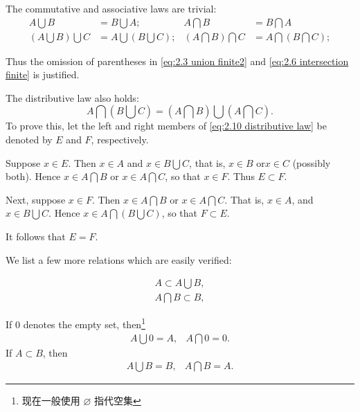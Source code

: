 The commutative and associative laws are trivial:
\begin{align}
        A \bigcup B &= B \bigcup A; &
        A \bigcap B &= B \bigcap A \label{eq:2.8 commutative} \\
        \left(A \bigcup B\right) \bigcup C &= A \bigcup \left(B \bigcup C\right); &
        \left(A \bigcap B\right) \bigcap C &= A \bigcap \left(B \bigcap C\right);\label{eq:2.9 distributive}
\end{align}

Thus the omission of parentheses in \ref{eq:2.3 union finite2} and \ref{eq:2.6 intersection finite} is justified.

The distributive law also holds:
\begin{equation}\label{eq:2.10 distributive law}
    A \bigcap \left( B \bigcup C\right) = 
    \left(A \bigcap B\right) \bigcup \left(A \bigcap C\right).
\end{equation}
To prove this, let the left and right members of \ref{eq:2.10 distributive law} be denoted by $E$ and $F$, respectively.

Suppose $x \in E$. Then $x \in A$ and $x \in B \bigcup C$, that is, $x \in B$ or$ x \in C$ (possibly both). Hence $x \in A\bigcap B$ or $x \in A\bigcap C$, so that $x \in F$. Thus $E \subset F$.

Next, suppose $x \in F$. Then $x \in A\bigcap B$ or $x \in A\bigcap C$. That is, $x \in A$, and $x \in B\bigcup C$. Hence $x \in A\bigcap \left(B \bigcup C\right)$, so that $F \subset E$.

It follows that $E = F$.

We list a few more relations which are easily verified:

\begin{align}
    A \subset A \bigcup B, \label{eq:2.11}\\
    A \bigcap B \subset B, \label{eq:2.12}
\end{align}

If $0$ denotes the empty set, then\footnote{现在一般使用 $\varnothing$ 指代空集}
\begin{equation}
    \begin{array}{cc}
        A \bigcup 0 = A, & A \bigcap 0 = 0.
    \end{array}
\end{equation}
If $A \subset B$, then
\begin{equation}
    \begin{array}{cc}
        A \bigcup B = B, & A \bigcap B = A.
    \end{array}
\end{equation}

